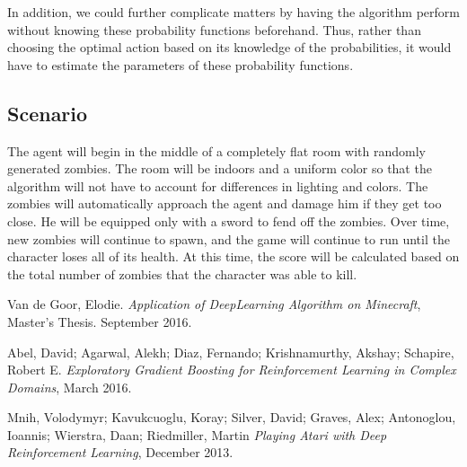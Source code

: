 \documentclass{article}
\begin{document}
In addition, we could further complicate matters by having the algorithm perform without knowing these probability functions beforehand. Thus, rather than choosing the optimal action based on its knowledge of the probabilities, it would have to estimate the parameters of these probability functions. 

\subsection{Scenario}

The agent will begin in the middle of a completely flat room with randomly generated zombies.  The room will be indoors and a uniform color so that the algorithm will not have to account for differences in lighting and colors. The zombies will automatically approach the agent and damage him if they get too close. He will be equipped only with a sword to fend off the zombies. Over time, new zombies will continue to spawn, and the game will continue to run until the character loses all of its health. At this time, the score will be calculated  based on the total number of zombies that the character was able to kill.

\pagebreak

\begin{thebibliography}{9}

  Van de Goor, Elodie.
  \emph{Application of DeepLearning Algorithm on Minecraft},
  Master's Thesis. September 2016. 
  
  Abel, David; Agarwal, Alekh; Diaz, Fernando; Krishnamurthy, Akshay; Schapire, Robert E.
  \emph{ Exploratory Gradient Boosting for Reinforcement Learning in Complex Domains},
  March 2016.
  
  Mnih, Volodymyr; Kavukcuoglu, Koray; Silver, David; Graves, Alex; Antonoglou, Ioannis; Wierstra, Daan;   Riedmiller, Martin
  \emph{Playing Atari with Deep Reinforcement Learning},
  December 2013.
  
\end{thebibliography}

\end{document}
